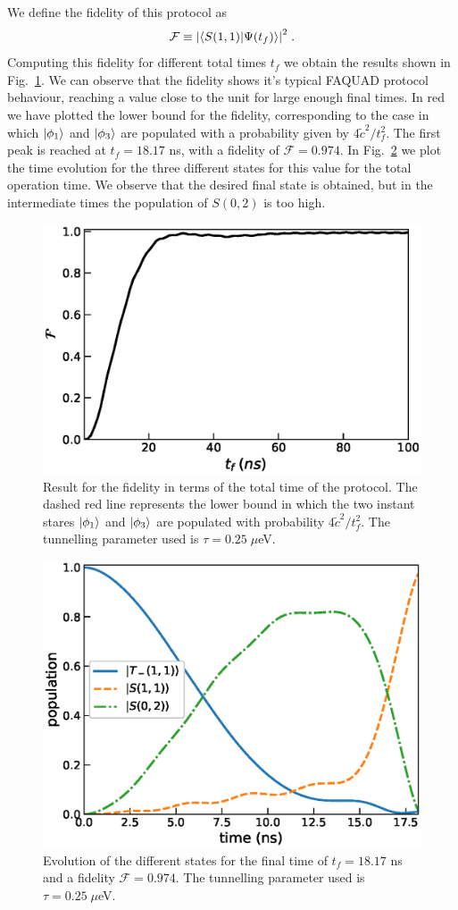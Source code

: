 \documentclass[a4paper,11pt]{article}
\begin{document}
We define the fidelity of this protocol as
\begin{equation}
	\mathcal{F}\equiv \abs{\braket{S(1,1)}{\Psi(t_f)}}^2\; .
\end{equation}
Computing this fidelity for different total times $t_f$ we obtain the results shown in Fig.~\ref{fig:FAQUAD_2QD_Results}. We can observe that the fidelity shows it's typical FAQUAD protocol behaviour, reaching a value close to the unit for large enough final times. In red we have plotted the lower bound for the fidelity, corresponding to the case in which $\ket{\phi_1}$ and $\ket{\phi_3}$ are populated with a probability given by $4\tilde{c}^2/t_f^2$. The first peak is reached at $t_f=18.17$ ns, with a fidelity of $\mathcal{F}=0.974$. In Fig.~\ref{fig:states_evolution} we plot the time evolution for the three different states for this value for the total operation time. We observe that the desired final state is obtained, but in the intermediate times the population of $S(0,2)$ is too high.
\begin{figure}[!htbp]
	\centering
	\includegraphics[width=0.7\linewidth]{FAQUAD_2QD_Results.eps}
	\caption{Result for the fidelity in terms of the total time of the protocol. The dashed red line represents the lower bound in which the two instant stares $\ket{\phi_1}$ and $\ket{\phi_3}$ are populated with probability $4\tilde{c}^2/t_f^2$. The tunnelling parameter used is $\tau=0.25\; \mu$eV.}
	\label{fig:FAQUAD_2QD_Results}
\end{figure}

\begin{figure}[!htbp]
	\centering
	\includegraphics[width=0.7\linewidth]{states_evolution.eps}
	\caption{Evolution of the different states for the final time of $t_f=18.17$ ns and a fidelity $\mathcal{F}=0.974$. The tunnelling parameter used is $\tau=0.25\; \mu$eV.}
	\label{fig:states_evolution}
\end{figure}
\end{document}
